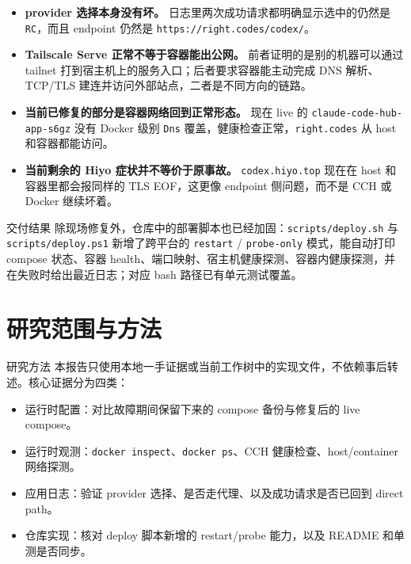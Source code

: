 \documentclass[a4paper]{article}
\newcommand{\filepath}[1]{\nolinkurl{#1}}
\begin{document}
\begin{itemize}
\item \textbf{provider 选择本身没有坏。} 日志里两次成功请求都明确显示选中的仍然是 \texttt{RC}，而且 endpoint 仍然是 \texttt{https://right.codes/codex/}。
\item \textbf{Tailscale Serve 正常不等于容器能出公网。} 前者证明的是别的机器可以通过 tailnet 打到宿主机上的服务入口；后者要求容器能主动完成 DNS 解析、TCP/TLS 建连并访问外部站点，二者是不同方向的链路。
\item \textbf{当前已修复的部分是容器网络回到正常形态。} 现在 live 的 \texttt{claude-code-hub-app-s6gz} 没有 Docker 级别 \texttt{Dns} 覆盖，健康检查正常，\texttt{right.codes} 从 host 和容器都能访问。
\item \textbf{当前剩余的 Hiyo 症状并不等价于原事故。} \texttt{codex.hiyo.top} 现在在 host 和容器里都会报同样的 TLS EOF，这更像 endpoint 侧问题，而不是 CCH 或 Docker 继续坏着。
\end{itemize}

\begin{findingbox}{交付结果}
除现场修复外，仓库中的部署脚本也已经加固：\filepath{scripts/deploy.sh} 与 \filepath{scripts/deploy.ps1} 新增了跨平台的 \texttt{restart} / \texttt{probe-only} 模式，能自动打印 compose 状态、容器 health、端口映射、宿主机健康探测、容器内健康探测，并在失败时给出最近日志；对应 bash 路径已有单元测试覆盖。
\end{findingbox}

\section{研究范围与方法}

\begin{methodbox}{研究方法}
本报告只使用本地一手证据或当前工作树中的实现文件，不依赖事后转述。核心证据分为四类：
\begin{itemize}
\item 运行时配置：对比故障期间保留下来的 compose 备份与修复后的 live compose。
\item 运行时观测：\texttt{docker inspect}、\texttt{docker ps}、CCH 健康检查、host/container 网络探测。
\item 应用日志：验证 provider 选择、是否走代理、以及成功请求是否已回到 direct path。
\item 仓库实现：核对 deploy 脚本新增的 restart/probe 能力，以及 README 和单测是否同步。
\end{itemize}
\end{methodbox}
\end{document}
